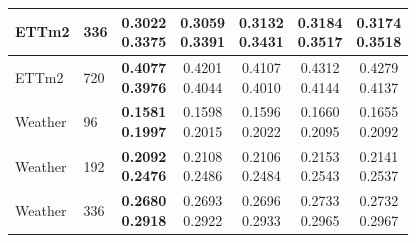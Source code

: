 \begin{center}
\begin{minipage}{\textwidth}
\begin{tabular}{@{}llccccc@{}}
ETTm2 & 336 & \shortstack{\colorbox[gray]{0.82}{\textbf{0.3022}}\\\colorbox[gray]{0.82}{\textbf{0.3375}}} & \shortstack{\colorbox[gray]{0.92}{0.3059}\\\colorbox[gray]{0.92}{0.3391}} & \shortstack{0.3132\\0.3431} & \shortstack{0.3184\\0.3517} & \shortstack{0.3174\\0.3518} \\ \hline

ETTm2 & 720 & \shortstack{\colorbox[gray]{0.82}{\textbf{0.4077}}\\\colorbox[gray]{0.82}{\textbf{0.3976}}} & \shortstack{0.4201\\0.4044} & \shortstack{\colorbox[gray]{0.92}{0.4107}\\\colorbox[gray]{0.92}{0.4010}} & \shortstack{0.4312\\0.4144} & \shortstack{0.4279\\0.4137} \\ \hline

Weather & 96 & \shortstack{\colorbox[gray]{0.82}{\textbf{0.1581}}\\\colorbox[gray]{0.82}{\textbf{0.1997}}} & \shortstack{0.1598\\\colorbox[gray]{0.92}{0.2015}} & \shortstack{\colorbox[gray]{0.92}{0.1596}\\0.2022} & \shortstack{0.1660\\0.2095} & \shortstack{0.1655\\0.2092} \\ \hline

Weather & 192 & \shortstack{\colorbox[gray]{0.82}{\textbf{0.2092}}\\\colorbox[gray]{0.82}{\textbf{0.2476}}} & \shortstack{0.2108\\0.2486} & \shortstack{\colorbox[gray]{0.92}{0.2106}\\\colorbox[gray]{0.92}{0.2484}} & \shortstack{0.2153\\0.2543} & \shortstack{0.2141\\0.2537} \\ \hline

Weather & 336 & \shortstack{\colorbox[gray]{0.82}{\textbf{0.2680}}\\\colorbox[gray]{0.82}{\textbf{0.2918}}} & \shortstack{\colorbox[gray]{0.92}{0.2693}\\\colorbox[gray]{0.92}{0.2922}} & \shortstack{0.2696\\0.2933} & \shortstack{0.2733\\0.2965} & \shortstack{0.2732\\0.2967} \\ \hline


\end{tabular}
\end{minipage}
\end{center}
